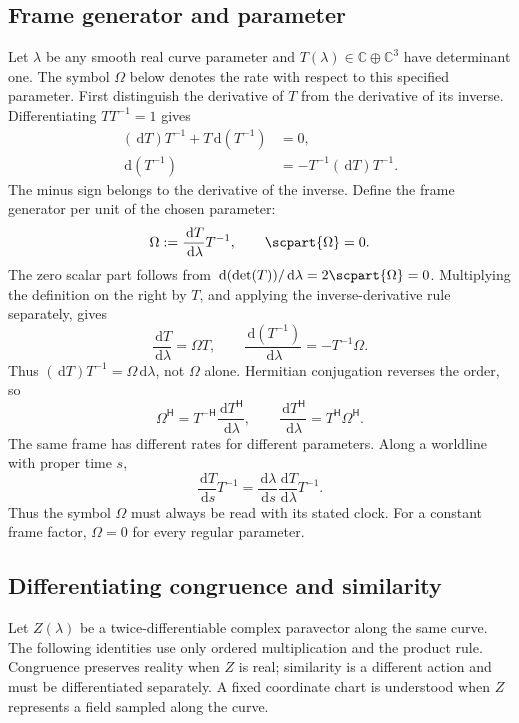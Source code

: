 \documentclass[11pt]{article}
\newcommand{\pv}[1]{{#1}}
\newcommand{\pvGreek}[1]{{#1}}
\newcommand{\pT}{\pv{T}}
\newcommand{\pZ}{\pv{Z}}
\newcommand{\pvOmega}{\pvGreek{\Omega}}
\numberwithin{equation}{section}
\newcommand{\C}{\mathbb{C}}
\newcommand{\dd}{\,\mathrm d}
\begin{document}
\subsection{Frame generator and parameter}
\label{sec:frame-generator-calculus}

Let $\lambda$ be any smooth real curve parameter and
$\pT(\lambda)\in\C\oplus\C^3$ have determinant one.
The symbol $\pvOmega$ below denotes the rate with respect to this
specified parameter.
First distinguish the derivative of $\pT$ from the derivative of
its inverse. Differentiating $\pT\pT^{-1}=1$ gives
\begin{align*}
 (\dd\pT)\pT^{-1}+\pT\dd(\pT^{-1})&=0,\\
 \dd(\pT^{-1})&=-\pT^{-1}(\dd\pT)\pT^{-1}.
\end{align*}
The minus sign belongs to the derivative of the inverse. Define
the frame generator per unit of the chosen parameter:
\begin{equation}
 \pvOmega:=\frac{\dd\pT}{\dd\lambda}\pT^{-1},\qquad
 \scpart{\pvOmega}=0.
 \label{eq:frame-generator}
\end{equation}
The zero scalar part follows from
$\dd(\det(\pT))/\dd\lambda=2\scpart{\pvOmega}=0$.
Multiplying the definition on the right by $\pT$, and applying
the inverse-derivative rule separately, gives
\[
 \boxed{\frac{\dd\pT}{\dd\lambda}=\pvOmega\pT,\qquad
 \frac{\dd(\pT^{-1})}{\dd\lambda}=-\pT^{-1}\pvOmega.}
\]
Thus $(\dd\pT)\pT^{-1}=\pvOmega\dd\lambda$, not $\pvOmega$ alone.
Hermitian conjugation reverses the order, so
\[
 \pvOmega^{\mathsf H}
 =\pT^{-\mathsf H}\frac{\dd\pT^{\mathsf H}}{\dd\lambda},
 \qquad
 \frac{\dd\pT^{\mathsf H}}{\dd\lambda}
 =\pT^{\mathsf H}\pvOmega^{\mathsf H}.
\]
The same frame has different rates for different parameters. Along a
worldline with proper time $s$,
\[
 \frac{\dd\pT}{\dd s}\pT^{-1}
 =\frac{\dd\lambda}{\dd s}
   \frac{\dd\pT}{\dd\lambda}\pT^{-1}.
\]
Thus the symbol $\pvOmega$ must always be read with its stated clock.
For a constant frame factor, $\pvOmega=0$ for every regular parameter.

\subsection{Differentiating congruence and similarity}
\label{sec:varying-transformations}

Let $\pZ(\lambda)$ be a twice-differentiable complex paravector along the
same curve. The following identities use only ordered multiplication
and the product rule. Congruence preserves reality when $\pZ$ is real;
similarity is a different action and must be differentiated separately.
A fixed coordinate chart is understood when $\pZ$ represents a field
sampled along the curve.
\end{document}
